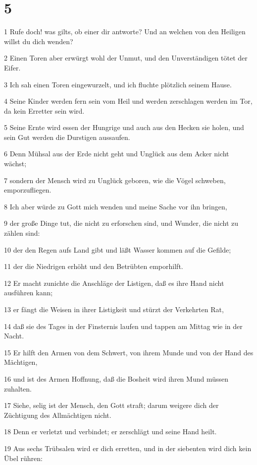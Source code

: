 \chapter{5}

\par 1 Rufe doch! was gilts, ob einer dir antworte? Und an welchen von den Heiligen willst du dich wenden?
\par 2 Einen Toren aber erwürgt wohl der Unmut, und den Unverständigen tötet der Eifer.
\par 3 Ich sah einen Toren eingewurzelt, und ich fluchte plötzlich seinem Hause.
\par 4 Seine Kinder werden fern sein vom Heil und werden zerschlagen werden im Tor, da kein Erretter sein wird.
\par 5 Seine Ernte wird essen der Hungrige und auch aus den Hecken sie holen, und sein Gut werden die Durstigen aussaufen.
\par 6 Denn Mühsal aus der Erde nicht geht und Unglück aus dem Acker nicht wächst;
\par 7 sondern der Mensch wird zu Unglück geboren, wie die Vögel schweben, emporzufliegen.
\par 8 Ich aber würde zu Gott mich wenden und meine Sache vor ihn bringen,
\par 9 der große Dinge tut, die nicht zu erforschen sind, und Wunder, die nicht zu zählen sind:
\par 10 der den Regen aufs Land gibt und läßt Wasser kommen auf die Gefilde;
\par 11 der die Niedrigen erhöht und den Betrübten emporhilft.
\par 12 Er macht zunichte die Anschläge der Listigen, daß es ihre Hand nicht ausführen kann;
\par 13 er fängt die Weisen in ihrer Listigkeit und stürzt der Verkehrten Rat,
\par 14 daß sie des Tages in der Finsternis laufen und tappen am Mittag wie in der Nacht.
\par 15 Er hilft den Armen von dem Schwert, von ihrem Munde und von der Hand des Mächtigen,
\par 16 und ist des Armen Hoffnung, daß die Bosheit wird ihren Mund müssen zuhalten.
\par 17 Siehe, selig ist der Mensch, den Gott straft; darum weigere dich der Züchtigung des Allmächtigen nicht.
\par 18 Denn er verletzt und verbindet; er zerschlägt und seine Hand heilt.
\par 19 Aus sechs Trübsalen wird er dich erretten, und in der siebenten wird dich kein Übel rühren:
